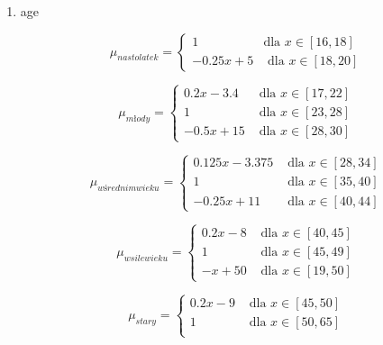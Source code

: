 \documentclass{classrep}
\begin{document}
\begin{enumerate}
  \item age

      \begin{equation}
        \mu_{nastolatek} =
          \begin{cases}
            1 & \text{dla } x \in [16,18] \\
            -0.25x +5 & \text{ dla } x \in [18,20]
          \end{cases}  
      \end{equation}

      \begin{equation}
        \mu_{młody} =
        \begin{cases}
            0.2x-3.4 & \text{ dla } x \in [17,22]  \\
            1 & \text{ dla } x \in [23,28] \\
            -0.5x + 15 & \text{ dla } x \in [28,30]
          \end{cases}
      \end{equation}

      \begin{equation}
        \mu_{w średnim wieku} =
        \begin{cases}
            0.125x-3.375 & \text{ dla } x \in [28,34]  \\
            1 & \text{ dla } x \in [35,40] \\
            -0.25x + 11 & \text{ dla } x \in [40,44]
          \end{cases}
      \end{equation} 

      \begin{equation}
        \mu_{w sile wieku} =
        \begin{cases}
            0.2x-8 & \text{ dla } x \in [40,45]  \\
            1 & \text{ dla } x \in [45,49] \\
            -x + 50 & \text{ dla } x \in [19,50]
          \end{cases}
      \end{equation} 

      \begin{equation}
        \mu_{stary} =
        \begin{cases}
            0.2x-9 & \text{ dla } x \in [45,50]  \\
            1 & \text{ dla } x \in [50,65] \\
          \end{cases}
      \end{equation} 


\end{enumerate}
\end{document}
